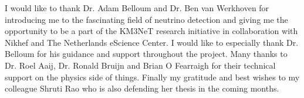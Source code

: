 

\begin{acknowledgements}      %
I would like to thank Dr. Adam Belloum and Dr. Ben van Werkhoven for
introducing me to the fascinating field of neutrino detection and
giving me the opportunity to be a part of the KM3NeT research
initiative in collaboration with Nikhef and The Netherlands eScience
Center. I would like to especially thank Dr. Belloum for his guidance
and support throughout the project. Many thanks to Dr. Roel Aaij, Dr.
Ronald Bruijn and Brian O Fearraigh for their technical support on the
physics side of things. Finally my gratitude and best wishes to my
colleague Shruti Rao who is also defending her thesis in the coming
months.
\end{acknowledgements}



